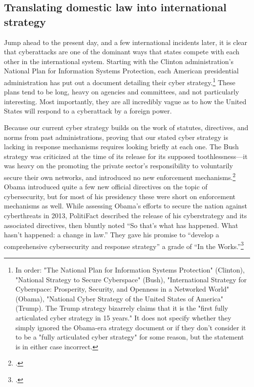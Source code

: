 \documentclass{report}
\begin{document}
\begin{refsegment}
\subsection{Translating domestic law into international strategy}
Jump ahead to the present day, and a few international incidents later, it is clear that cyberattacks are one of the dominant ways that states compete with each other in the international system. Starting with the Clinton administration's National Plan for Information Systems Protection, each American presidential administration has put out a document detailing their cyber strategy.\footnote{In order: "The National Plan for Information Systems Protection" (Clinton), "National Strategy to Secure Cyberspace" (Bush), "International Strategy for Cyberspace: Prosperity, Security, and Openness in a Networked World" (Obama), "National Cyber Strategy of the United States of America" (Trump). The Trump strategy bizarrely claims that it is the "first fully articulated cyber strategy in 15 years." It does not specify whether they simply ignored the Obama-era strategy document or if they don't consider it to be a "fully articulated cyber strategy" for some reason, but the statement is in either case incorrect.} These plans tend to be long, heavy on agencies and committees, and not particularly interesting. Most importantly, they are all incredibly vague as to how the United States will respond to a cyberattack by a foreign power.

Because our current cyber strategy builds on the work of statutes, directives, and norms from past administrations, proving that our stated cyber strategy is lacking in response mechanisms requires looking briefly at each one. The Bush strategy was criticized at the time of its release for its supposed toothlessness---it was heavy on the promoting the private sector's responsibility to voluntarily secure their own networks, and introduced no new enforcement mechanisms.\footcite{lemos_bush_2003} Obama introduced quite a few new official directives on the topic of cybersecurity, but for most of his presidency these were short on enforcement mechanisms as well. While assessing Obama's efforts to secure the nation against cyberthreats in 2013, PolitiFact described the release of his cyberstrategy and its associated directives, then bluntly noted ``So that's what has happened. What hasn't happened: a change in law.'' They gave his promise to ``develop a comprehensive cybersecurity and response strategy'' a grade of ``In the Works.''\footcite{moorhead_work_2013}


\end{refsegment}
\end{document}
